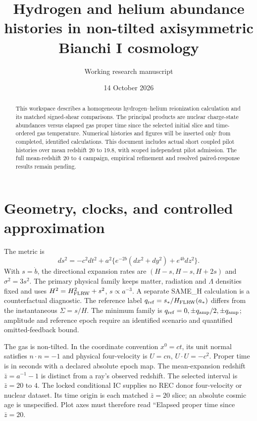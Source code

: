 \documentclass[11pt]{article}
\title{Hydrogen and helium abundance histories in non-tilted axisymmetric Bianchi I cosmology}
\author{Working research manuscript}
\date{14 October 2026}
\begin{document}
\maketitle
\begin{abstract}
This workspace describes a homogeneous hydrogen--helium reionization calculation and its matched signed-shear comparisons. The principal products are nuclear charge-state abundances versus elapsed gas proper time since the selected initial slice and time-ordered gas temperature. Numerical histories and figures will be inserted only from completed, identified calculations. This document includes actual short coupled pilot histories over mean redshift 20 to 19.8, with scoped independent pilot admission. The full mean-redshift 20 to 4 campaign, empirical refinement and resolved paired-response results remain pending.
\end{abstract}
\section{Geometry, clocks, and controlled approximation}
The metric is
\begin{equation}
 ds^2=-c^2dt^2+a^2\{e^{-2b}(dx^2+dy^2)+e^{4b}dz^2\}.
\end{equation}
With $s=\dot b$, the directional expansion rates are $(H-s,H-s,H+2s)$ and $\sigma^2=3s^2$. The primary physical family keeps matter, radiation and $\Lambda$ densities fixed and uses $H^2=H_{\rm FLRW}^2+s^2$, $s\propto a^{-3}$. A separate SAME\_H calculation is a counterfactual diagnostic. The reference label $q_{\rm ref}=s_*/H_{\rm FLRW}(a_*)$ differs from the instantaneous $\Sigma=s/H$. The minimum family is $q_{\rm ref}=0,\pm q_{\rm amp}/2,\pm q_{\rm amp}$; amplitude and reference epoch require an identified scenario and quantified omitted-feedback bound.

The gas is non-tilted. In the coordinate convention $x^0=ct$, its unit normal satisfies $n\cdot n=-1$ and physical four-velocity is $U=cn$, $U\cdot U=-c^2$. Proper time is in seconds with a declared absolute epoch map. The mean-expansion redshift $\bar z=a^{-1}-1$ is distinct from a ray's observed redshift. The selected interval is $\bar z=20$ to $4$. The locked conditional IC supplies no REC donor four-velocity or nuclear dataset. Its time origin is each matched $\bar z=20$ slice; an absolute cosmic age is unspecified. Plot axes must therefore read ``Elapsed proper time since $\bar z=20$.
\end{document}
